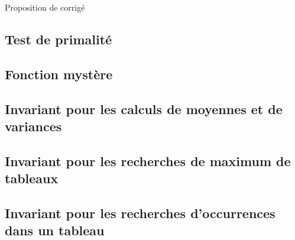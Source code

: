 
\vspace{0.1cm}
\begin{huge}
 Proposition de corrigé
\end{huge}

\subsection{Test de primalité}
\setcounter{thequestion}{0}

\subsection{Fonction mystère}
\setcounter{thequestion}{0}

\subsection{Invariant pour les calculs de moyennes et de variances}
\setcounter{thequestion}{0}

\subsection{Invariant pour les recherches de maximum de tableaux}
\setcounter{thequestion}{0}

\subsection{Invariant pour les recherches d'occurrences dans un tableau}
\setcounter{thequestion}{0}

